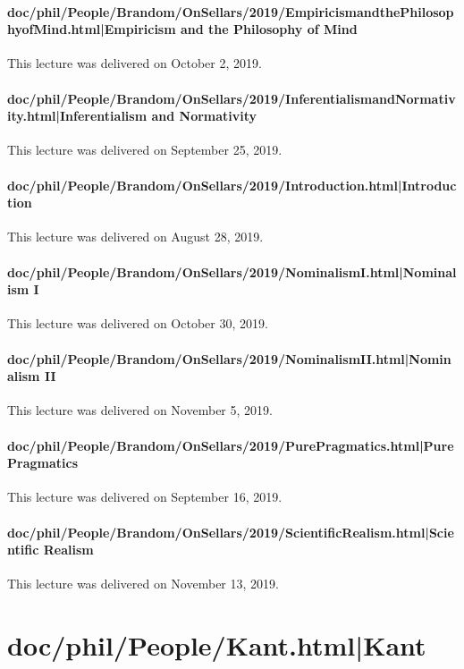 \documentclass[12pt,a4paper]{report}
\begin{document}
\paragraph{doc/phil/People/Brandom/OnSellars/2019/EmpiricismandthePhilosophyofMind.html|Empiricism and the Philosophy of Mind}
This lecture was delivered on October 2, 2019.

\paragraph{doc/phil/People/Brandom/OnSellars/2019/InferentialismandNormativity.html|Inferentialism and Normativity}
This lecture was delivered on September 25, 2019.

\paragraph{doc/phil/People/Brandom/OnSellars/2019/Introduction.html|Introduction}
This lecture was delivered on August 28, 2019.

\paragraph{doc/phil/People/Brandom/OnSellars/2019/NominalismI.html|Nominalism I}
This lecture was delivered on October 30, 2019.

\paragraph{doc/phil/People/Brandom/OnSellars/2019/NominalismII.html|Nominalism II}
This lecture was delivered on November 5, 2019.

\paragraph{doc/phil/People/Brandom/OnSellars/2019/PurePragmatics.html|Pure Pragmatics}
This lecture was delivered on September 16, 2019.

\paragraph{doc/phil/People/Brandom/OnSellars/2019/ScientificRealism.html|Scientific Realism}
This lecture was delivered on November 13, 2019.

\section{doc/phil/People/Kant.html|Kant}
\end{document}
